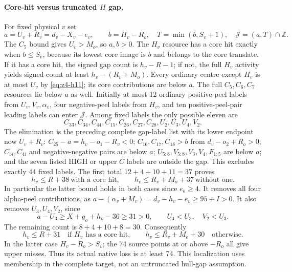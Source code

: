 \documentclass[11pt,letterpaper]{article}
\theoremstyle{definition}\newtheorem{definition}[theorem]{Definition}
\begin{document}
\paragraph{Core-hit versus truncated $H$ gap.}
For fixed physical $v$ set
\[
 a=U_v+R_v=d_v-X_v-e_v,\qquad b=H_v-R_o,
 \quad T=\min(b,S_v+1),\quad\mathcal J=(a,T)\cap\mathbb Z.
\]
The $C_5$ bound gives $U_v>M_o$, so $a,b>0$.
The $H_v$ resource has a core hit exactly when $b\le S_v$, because its lowest core image is $b$ and belongs to the core translate.
If it has a core hit, the signed gap count is $h_v-R-1$; if not, the full $H_v$ activity yields signed count at least $h_v-(R_v+M_o)$.
Every ordinary centre except $H_v$ is at most $U_v$ by \eqref{eq:z4-h11}; its core contributions are below $a$. The full $C_5,C_6,C_7$ resources lie below $a$ as well. Initially at most 12 ordinary positive-peel labels from $U_v,V_v,\alpha_v$, four negative-peel labels from $H_v$, and ten positive-peel-pair leading labels can enter $\mathcal J$.
Among fixed labels the only possible eleven are
\[
 C_{33},C_{34},C_{44},C_{15},C_{26},C_{27},C_{28},U_2,U_3,U_4,V_2.
\]
The elimination is the preceding complete gap-label list with its lower endpoint now $U_v+R_v$: $C_{25}-a=h_v-o_1-R_v<0$; $C_{16},C_{17},C_{18}>b$ from $d_v-o_2+R_o>0$; $C_{3i},C_{4i}$ and negative-negative pairs are below $a$; $U_{5:8},V_{5:8},V_3,V_4,F_{1:5}$ are below $a$; and the seven listed HIGH or upper $C$ labels are outside the gap. This excludes exactly 44 fixed labels.
The first total $12+4+10+11=37$ proves
\[
 h_v\le R+38\ \text{with a core hit},\qquad
 h_v\le R_v+M_o+37\ \text{without one}.
\]
In particular the latter bound holds in both cases since $e_o\ge4$.
It removes all four alpha-peel contributions, as
$a-(\alpha_v+M_v)=d_v-h_v-e_v\ge95+I>0$.
It also removes $U_3,U_4,V_2$, since
\[
 a-U_3\ge X+g_o+h_o-36\ge31>0,
 \qquad U_4<U_3,\quad V_2<U_3.
\]
The remaining count is $8+4+10+8=30$. Consequently
\begin{equation}\label{eq:z4-coreH}
 h_v\le R+31\quad\text{if }H_v\text{ has a core hit},\qquad
 h_v\le R_v+M_o+30\quad\text{otherwise}.
\end{equation}
In the latter case $H_v-R_o>S_v$; the 74 source points at or above $-R_o$ all give upper misses. Thus its actual native loss is at least 74. This localization uses membership in the complete target, not an untruncated hull-gap assumption.
\end{document}
